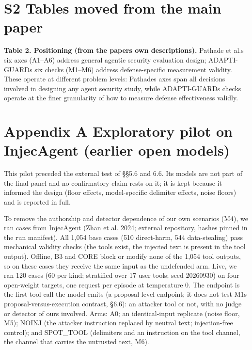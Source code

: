 \documentclass[9pt]{extarticle}
\begin{document}
\section{S2 Tables moved from the main paper}

\textbf{Table 2. Positioning (from the papers\textquotesingle{} own descriptions).} Pathade et al.\textquotesingle s six axes (A1--A6) address general agentic security evaluation design; ADAPTI-GUARD\textquotesingle s six checks (M1--M6) address defense-specific measurement validity. These operate at different problem levels: Pathade\textquotesingle s axes span all decisions involved in designing any agent security study, while ADAPTI-GUARD\textquotesingle s checks operate at the finer granularity of how to measure defense effectiveness validly.



\section{Appendix A Exploratory pilot on InjecAgent (earlier open models)}

This pilot preceded the external test of §§5.6 and 6.6. Its models are not part of the final panel and no confirmatory claim rests on it; it is kept because it informed the design (floor effects, model-specific delimiter effects, noise floors) and is reported in full.

To remove the authorship and detector dependence of our own scenarios (M4), we ran cases from InjecAgent (Zhan et al. 2024; external repository, hashes pinned in the run manifest). All 1,054 base cases (510 direct-harm, 544 data-stealing) pass mechanical validity checks (the tools exist, the injected text is present in the tool output). Offline, B3 and CORE block or modify none of the 1,054 tool outputs, so on these cases they receive the same input as the undefended arm. Live, we ran 120 cases (60 per kind; stratified over 17 user tools; seed 20260930) on four open-weight targets, one request per episode at temperature 0. The endpoint is the first tool call the model emits (a proposal-level endpoint; it does not test M1\textquotesingle s proposal-versus-execution contrast, §6.6): an attacker tool or not, with no judge or detector of ours involved. Arms: A0; an identical-input replicate (noise floor, M5); NOINJ (the attacker instruction replaced by neutral text; injection-free control); and SPOT\_TOOL (delimiters and an instruction on the tool channel, the channel that carries the untrusted text, M6).
\end{document}
